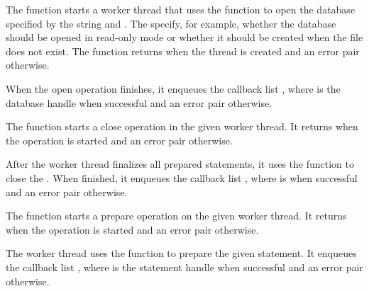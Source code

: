 \begin{function}
\end{function}

The  function starts a worker thread that
uses the  function to open the database
specified by the  string and . The
 specify, for example, whether the database should be
opened in read-only mode or whether it should be created when the file
does not exist. The function returns  when the thread is
created and an error pair otherwise.

When the open operation finishes, it enqueues the callback list
, where  is the
database handle when successful and an error pair otherwise.

\begin{function}
\end{function}

The  function starts a close operation in
the given  worker thread. It returns  when the
operation is started and an error pair otherwise.

After the worker thread finalizes all prepared statements, it uses the
 function to close the . When
finished, it enqueues the callback list , where  is  when successful and
an error pair otherwise.

\begin{function}
\end{function}

The  function starts a prepare operation
on the given  worker thread. It returns  when
the operation is started and an error pair otherwise.

The worker thread uses the  function to
prepare the given  statement. It enqueues the callback list
, where  is the
statement handle when successful and an error pair otherwise.

